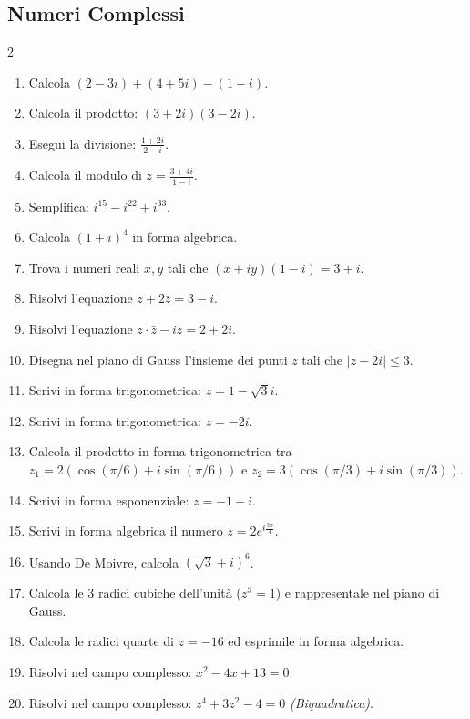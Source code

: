 \subsection{Numeri Complessi}
\begin{multicols}{2}
\begin{enumerate}
    \item {} Calcola $(2 - 3i) + (4 + 5i) - (1 - i)$.
    \item {} Calcola il prodotto: $(3 + 2i)(3 - 2i)$.
    \item {} Esegui la divisione: $\frac{1 + 2i}{2 - i}$.
    \item {} Calcola il modulo di $z = \frac{3+4i}{1-i}$.
    \item {} Semplifica: $i^{15} - i^{22} + i^{33}$.
    \item {} Calcola $(1+i)^4$ in forma algebrica.
    \item {} Trova i numeri reali $x,y$ tali che $(x+iy)(1-i) = 3 + i$.
    \item {} Risolvi l'equazione $z + 2\bar{z} = 3 - i$.
    \item {} Risolvi l'equazione $z \cdot \bar{z} - i z = 2 + 2i$.
    \item {} Disegna nel piano di Gauss l'insieme dei punti $z$ tali che $|z - 2i| \le 3$.
    
    \item {} Scrivi in forma trigonometrica: $z = 1 - \sqrt{3}i$.
    \item {} Scrivi in forma trigonometrica: $z = -2i$.
    \item {} Calcola il prodotto in forma trigonometrica tra $z_1 = 2(\cos(\pi/6) + i\sin(\pi/6))$ e $z_2 = 3(\cos(\pi/3) + i\sin(\pi/3))$.
    \item {} Scrivi in forma esponenziale: $z = -1 + i$.
    \item {} Scrivi in forma algebrica il numero $z = 2e^{i\frac{3\pi}{4}}$.
    \item {} Usando De Moivre, calcola $(\sqrt{3} + i)^6$.
    \item {} Calcola le 3 radici cubiche dell'unità ($z^3 = 1$) e rappresentale nel piano di Gauss.
    \item {} Calcola le radici quarte di $z = -16$ ed esprimile in forma algebrica.
    \item {} Risolvi nel campo complesso: $x^2 - 4x + 13 = 0$.
    \item {} Risolvi nel campo complesso: $z^4 + 3z^2 - 4 = 0$ \textit{(Biquadratica)}.
\end{enumerate}
\end{multicols}